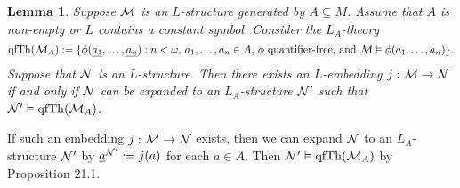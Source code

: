 \documentclass[10pt]{article}
\makeatletter
\DeclareMathOperator{\qfTh}{qfTh}
\theoremstyle{newstyle}
\newtheorem{lemma}[thm]{Lemma}
\newenvironment{pf}[1][\proofname]{\par
  \pushQED{\qed}%
  \normalfont \topsep0\p@\relax
  \trivlist
  \item[\hskip\labelsep\scshape
  #1\@addpunct{.}]\ignorespaces
}{%
  \popQED\endtrivlist\@endpefalse
}
\makeatother
\begin{document}
\begin{lemma}
Suppose ${\cal M}$ is an $L$-structure generated by $A \subseteq M$. Assume that 
$A$ is non-empty or $L$ contains a constant symbol. Consider the $L_A$-theory
\[ \qfTh({\cal M}_A) := \{\phi(\underline{a_1}, \dots, \underline{a_n}) : 
n < \omega,\, a_1, \dots, a_n \in A,\, \phi \text{ quantifier-free, and } 
{\cal M} \vDash \phi(a_1, \dots, a_n)\}. \]
Suppose that ${\cal N}$ is an $L$-structure. Then there exists an $L$-embedding 
$j : {\cal M} \to {\cal N}$ if and only if ${\cal N}$ can be expanded to an 
$L_A$-structure ${\cal N}'$ such that ${\cal N}' \vDash \qfTh({\cal M}_A)$. 
\end{lemma}
\begin{pf}
If such an embedding $j : {\cal M} \to {\cal N}$ exists, then we can expand ${\cal N}$ 
to an $L_A$-structure ${\cal N}'$ by $\underline{a}^{{\cal N}'} := j(a)$ for each 
$a \in A$. Then ${\cal N}' \vDash \qfTh({\cal M}_A)$ by Proposition 21.1.


\end{pf}
\end{document}

